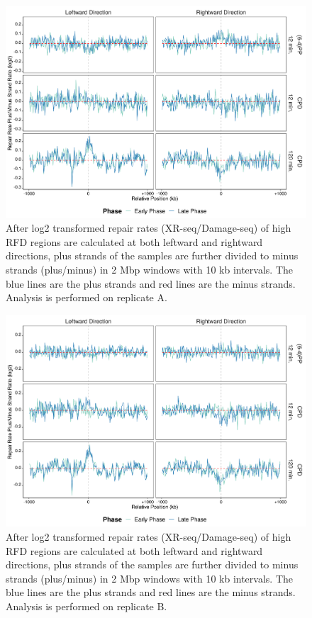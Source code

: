 \begin{figure}[H]
\begin{center}
\includegraphics[width=\textwidth]{Chapters/7_appendix/figures/supfig78}
\caption[Repair rate plus/minus ratio of high RFDs in 2 Mbp (replicate A).]{After log2 transformed repair rates (XR-seq/Damage-seq) of high RFD regions are calculated at both leftward and rightward directions, plus strands of the samples are further divided to minus strands (plus/minus) in 2 Mbp windows with 10 kb intervals. The blue lines are the plus strands and red lines are the minus strands. Analysis is performed on replicate A.}
\label{supfig:rrpm2000rfdA}
\end{center}
\end{figure}

\begin{figure}[H]
\begin{center}
\includegraphics[width=\textwidth]{Chapters/7_appendix/figures/supfig79}
\caption[Repair rate plus/minus ratio of high RFDs in 2 Mbp (replicate B).]{After log2 transformed repair rates (XR-seq/Damage-seq) of high RFD regions are calculated at both leftward and rightward directions, plus strands of the samples are further divided to minus strands (plus/minus) in 2 Mbp windows with 10 kb intervals. The blue lines are the plus strands and red lines are the minus strands. Analysis is performed on replicate B.}
\label{supfig:rrpm2000rfdB}
\end{center}
\end{figure}
